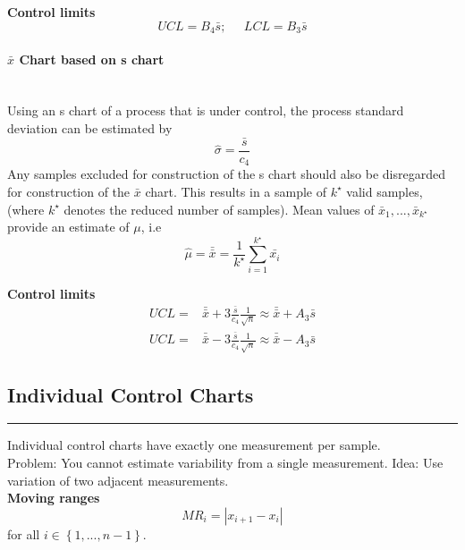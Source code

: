 \textbf{Control limits}
\begin{equation}
    UCL = B_4 \bar{s}; \;\;\;\;\; LCL = B_3 \bar{s}
\end{equation}

\paragraph{$\bar{x}$ Chart based on s chart}\mbox{}\\
Using an s chart of a process that is under control, the process standard deviation can be estimated by
\begin{equation}
  \hat{\sigma} = \frac{\bar{s}}{c_4}
\end{equation}
Any samples excluded for construction of the s chart should also be disregarded for construction of the $\bar{x}$ chart.
This results in a sample of $k^\star$ valid samples, (where $k^\star$ denotes the reduced number of samples).
Mean values of $\bar{x}_1, ... ,\bar{x}_{k^\star}$ provide an estimate of $\mu$, i.e
\begin{equation}
  \hat{\mu} = \bar{\bar{x}} = \frac{1}{k^\star} \sum^{k^\star}_{i=1} \bar{x_i}
\end{equation}

\textbf{Control limits}
\begin{equation}
  \begin{split}
    UCL =& \bar{\bar{x}} + 3\frac{\bar{s}}{c_4} \frac{1}{\sqrt{n}} \approx \bar{\bar{x}} + A_3 \bar{s}\\
    UCL =& \bar{\bar{x}} - 3\frac{\bar{s}}{c_4} \frac{1}{\sqrt{n}} \approx \bar{\bar{x}} - A_3 \bar{s}
  \end{split}
\end{equation}

\subsection{Individual Control Charts}
\noindent\rule[\linienAbstand]{\linewidth}{\linienDicke}
Individual control charts have exactly one measurement per sample.\\
Problem: You cannot estimate variability from a single measurement.
Idea: Use variation of two adjacent measurements.\\

\textbf{Moving ranges}
\begin{equation}
  MR_i = |x_{i+1} - x_i|
\end{equation}
for all $i \in \left\{1,...,n-1\right\}$.\\

